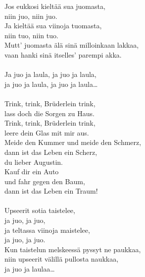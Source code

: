 
            Jos eukkosi kieltää sua juomasta, \\
            niin juo, niin juo. \\
            Ja kieltää sua viinoja tuomasta, \\
            niin tuo, niin tuo. \\
            Mutt’ juomasta älä sinä milloinkaan lakkaa, \\
            vaan hanki sinä itselles’ parempi akka. \\
\hspace{10mm} \\
            Ja juo ja laula, ja juo ja laula, \\
            ja juo ja laula, ja juo ja laula… \\
\hspace{10mm} \\
            Trink, trink, Brüderlein trink, \\
            lass doch die Sorgen zu Haus. \\
            Trink, trink, Brüderlein trink, \\
            leere dein Glas mit mir aus. \\
            Meide den Kummer und meide den Schmerz, \\
            dann ist das Leben ein Scherz, \\
            du lieber Augustin. \\
            Kauf dir ein Auto \\
            und fahr gegen den Baum, \\
            dann ist das Leben ein Traum! \\
\hspace{10mm} \\
            Upseerit sotia taistelee, \\
            ja juo, ja juo, \\
            ja teltassa viinoja maistelee, \\
            ja juo, ja juo. \\
            Kun taistelun melskeessä pyssyt ne paukkaa, \\
            niin upseerit välillä pullosta naukkaa, \\
            ja juo ja laulaa… \\
\hspace{10mm} \\
